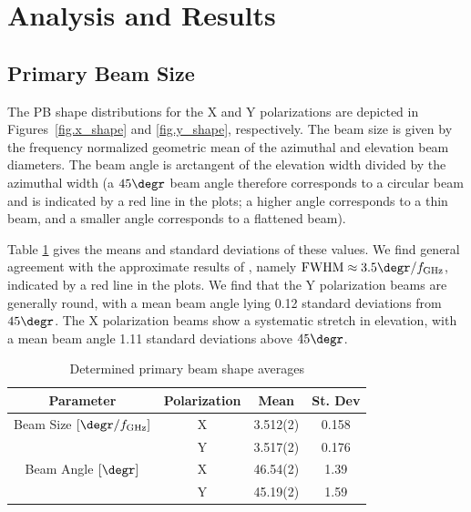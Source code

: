 \documentclass[preprint]{aastex}
\begin{document}
\section{Analysis and Results}\label{s.results}

\subsection{Primary Beam Size}\label{ss.beamsize}
The PB shape distributions for the X and Y polarizations are depicted in 
Figures~\ref{fig.x_shape} and \ref{fig.y_shape}, respectively.  The beam size 
is given by the frequency normalized geometric mean of the azimuthal and 
elevation beam diameters.  The beam angle is arctangent of the elevation 
width divided by the azimuthal width (a $45\degr$ beam angle therefore 
corresponds to a circular beam and is indicated by a red line in the plots; a 
higher angle corresponds to a thin beam, and a smaller angle corresponds 
to a flattened beam).

Table \ref{tab.beamshape} gives the means and standard
deviations of these values.  We find general agreement with the
approximate results of \citet{Harp2011}, namely $\textrm{FWHM} \approx
3.5\degr / f_\textrm{GHz}$, indicated by a red line in the plots.  We find 
that the Y polarization beams are generally round, with a mean beam angle 
lying 0.12 standard deviations from $45\degr$.  The X polarization beams 
show a systematic stretch in elevation, with a mean beam angle 1.11 
standard deviations above $45\degr$.

\begin{table}[htb]
\begin{center}
\begin{tabular}{cccc}
Parameter & Polarization & Mean & St. Dev \\
\hline
Beam Size $[\degr / f_\textrm{GHz}]$ & X & 3.512(2) & 0.158 \\
                                                             & Y & 3.517(2) & 0.176 \\ \hline
Beam Angle $[\degr]$ & X & 46.54(2) & 1.39 \\
                                     & Y & 45.19(2) & 1.59
\end{tabular}
\caption{Determined primary beam shape averages \label{tab.beamshape}}
\end{center}
\end{table}
\end{document}
